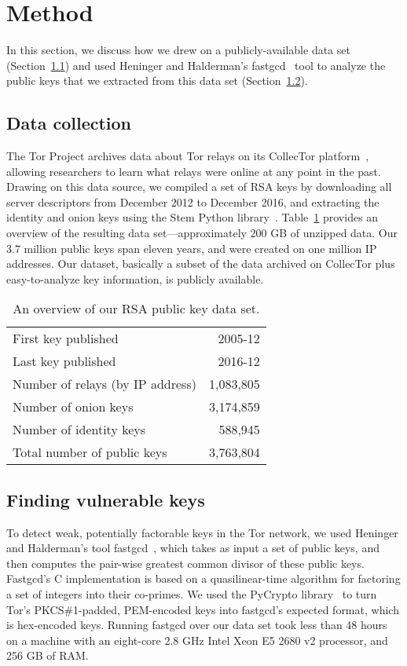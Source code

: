 \section{Method}
\label{sec:method}
In this section, we discuss how we drew on a publicly-available data set
(Section~\ref{sec:data-collection}) and used Heninger and Halderman's
fastgcd~\cite{fastgcd} tool to analyze the public keys that we extracted from
this data set (Section~\ref{sec:vulnerable-keys}).

\subsection{Data collection}
\label{sec:data-collection}
The Tor Project archives data about Tor relays on its CollecTor
platform~\cite{collector}, allowing researchers to learn what relays were online
at any point in the past.  Drawing on this data source, we compiled a set of RSA
keys by downloading all server descriptors from December 2012 to December 2016,
and extracting the identity and onion keys using the Stem Python
library~\cite{stem}.  Table~\ref{tab:dataset} provides an overview of the
resulting data set---approximately 200 GB of unzipped data.  Our 3.7 million
public keys span eleven years, and were created on one million IP addresses.
Our dataset, basically a subset of the data archived on CollecTor plus
easy-to-analyze key information, is publicly available.

\begin{table}[t]
	\centering
	\begin{tabular}{l r}
	\toprule
	First key published & 2005-12 \\
	Last key published & 2016-12 \\
	Number of relays (by IP address) & 1,083,805 \\
	\midrule
	Number of onion keys & 3,174,859 \\
	Number of identity keys & 588,945 \\
	\midrule
	Total number of public keys & 3,763,804 \\
	\bottomrule
	\end{tabular}
	\caption{An overview of our RSA public key data set.}
	\label{tab:dataset}
\end{table}

\subsection{Finding vulnerable keys}
\label{sec:vulnerable-keys}
To detect weak, potentially factorable keys in the Tor network, we used Heninger
and Halderman's tool fastgcd~\cite{fastgcd}, which takes as input a set of
public keys, and then computes the pair-wise greatest common divisor of these
public keys.  Fastgcd's C implementation is based on a quasilinear-time
algorithm for factoring a set of integers into their co-primes.  We used the
PyCrypto library~\cite{pycrypto} to turn Tor's PKCS\#1-padded, PEM-encoded keys
into fastgcd's expected format, which is hex-encoded keys.  Running fastgcd over
our data set took less than 48 hours on a machine with an eight-core 2.8 GHz
Intel Xeon E5 2680 v2 processor, and 256 GB of RAM.
